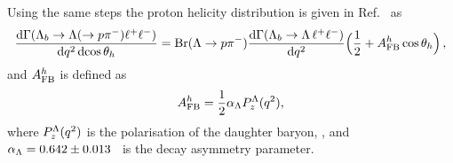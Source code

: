 Using the same steps the proton helicity distribution is given in Ref.~\cite{Gutsche:2013pp} as
\begin{equation}
\frac{\mathrm{d}\Gamma(\Lambda_{b}\to \Lambda(\to p \pi^{-})\ell^{+}\ell^{-})}
     {\mathrm{d}\qsq\,\mathrm{d}\!\cos\theta_h} 
={\rm Br}(\Lambda \to p\pi^{-})
 \frac{\mathrm{d}\Gamma(\Lambda_b \to \Lambda\, \ell^{+}\ell^{-})}{\mathrm{d}\qsq}
\Big(\frac{1}{2}+\afbh\cos\theta_h\Big) \,,
\label{eq:afbBTh}
\end{equation}
and $A_{\rm FB}^h$ is defined as
\begin{equation}
A_{\rm FB}^h=\frac{1}{2}\alpha_{\Lambda}P_z^\Lambda(q^2),
\end{equation} 
where $P_z^\Lambda(q^2)$ is the polarisation of the daughter baryon, \Lz,
and $\alpha_{\Lambda} = 0.642 \pm 0.013$~\cite{PDG2014} is the \Lz decay asymmetry parameter.



